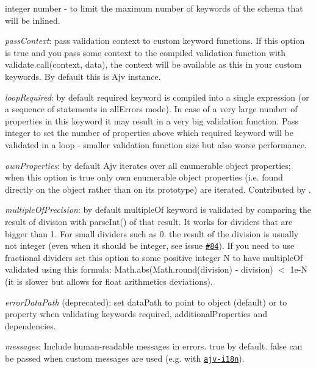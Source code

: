 \begin{DoxyItemize}
\begin{DoxyItemize}
\item integer number -\/ to limit the maximum number of keywords of the schema that will be inlined.
\end{DoxyItemize}
\item {\itshape pass\+Context}\+: pass validation context to custom keyword functions. If this option is {\ttfamily true} and you pass some context to the compiled validation function with {\ttfamily validate.\+call(context, data)}, the {\ttfamily context} will be available as {\ttfamily this} in your custom keywords. By default {\ttfamily this} is Ajv instance.
\item {\itshape loop\+Required}\+: by default {\ttfamily required} keyword is compiled into a single expression (or a sequence of statements in {\ttfamily all\+Errors} mode). In case of a very large number of properties in this keyword it may result in a very big validation function. Pass integer to set the number of properties above which {\ttfamily required} keyword will be validated in a loop -\/ smaller validation function size but also worse performance.
\item {\itshape own\+Properties}\+: by default Ajv iterates over all enumerable object properties; when this option is {\ttfamily true} only own enumerable object properties (i.\+e. found directly on the object rather than on its prototype) are iterated. Contributed by .
\item {\itshape multiple\+Of\+Precision}\+: by default {\ttfamily multiple\+Of} keyword is validated by comparing the result of division with parse\+Int() of that result. It works for dividers that are bigger than 1. For small dividers such as 0. the result of the division is usually not integer (even when it should be integer, see issue \href{https://github.com/epoberezkin/ajv/issues/84}{\tt \#84}). If you need to use fractional dividers set this option to some positive integer N to have {\ttfamily multiple\+Of} validated using this formula\+: {\ttfamily Math.\+abs(Math.\+round(division) -\/ division) $<$ 1e-\/N} (it is slower but allows for float arithmetics deviations).
\item {\itshape error\+Data\+Path} (deprecated)\+: set {\ttfamily data\+Path} to point to \textquotesingle{}object\textquotesingle{} (default) or to \textquotesingle{}property\textquotesingle{} when validating keywords {\ttfamily required}, {\ttfamily additional\+Properties} and {\ttfamily dependencies}.
\item {\itshape messages}\+: Include human-\/readable messages in errors. {\ttfamily true} by default. {\ttfamily false} can be passed when custom messages are used (e.\+g. with \href{https://github.com/epoberezkin/ajv-i18n}{\tt ajv-\/i18n}).

\end{DoxyItemize}
